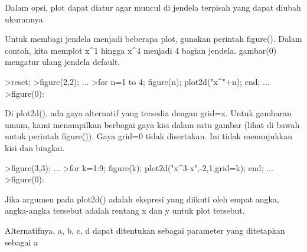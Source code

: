 \documentclass[a4paper,10pt]{article}
\begin{document}
\begin{eulernotebook}
\begin{eulercomment}
\begin{eulercomment}
\begin{eulercomment}
\begin{eulercomment}
\begin{eulercomment}
Dalam opsi, plot dapat diatur agar muncul di jendela terpisah yang
dapat diubah ukurannya.

Untuk membagi jendela menjadi beberapa plot, gunakan perintah
figure(). Dalam contoh, kita memplot x\textasciicircum{}1 hingga x\textasciicircum{}4 menjadi 4 bagian
jendela. gambar(0) mengatur ulang jendela default.
\end{eulercomment}
\begin{eulerprompt}
>reset;
>figure(2,2); ...
>for n=1 to 4; figure(n); plot2d("x^"+n); end; ...
>figure(0):
\end{eulerprompt}
\begin{eulercomment}
Di plot2d(), ada gaya alternatif yang tersedia dengan grid=x. Untuk
gambaran umum, kami menampilkan berbagai gaya kisi dalam satu gambar
(lihat di bawah untuk perintah figure()). Gaya grid=0 tidak
disertakan. Ini tidak menunjukkan kisi dan bingkai.
\end{eulercomment}
\begin{eulerprompt}
>figure(3,3); ...
>for k=1:9; figure(k); plot2d("x^3-x",-2,1,grid=k); end; ...
>figure(0):
\end{eulerprompt}
\begin{eulercomment}
Jika argumen pada plot2d() adalah ekspresi yang diikuti oleh empat
angka, angka-angka tersebut adalah rentang x dan y untuk plot
tersebut.

Alternatifnya, a, b, c, d dapat ditentukan sebagai parameter yang
ditetapkan sebagai a


\end{eulercomment}
\end{eulercomment}
\end{eulercomment}
\end{eulercomment}
\end{eulercomment}
\end{eulernotebook}
\end{document}
